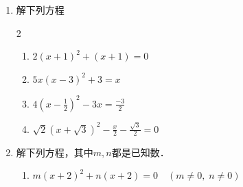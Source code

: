 \begin{enumerate}
        \begin{enumerate}
    \item $\sqrt{2}\left(x^{2}-x\right)=\frac{1}{\sqrt{2}}\left(x^{2}+x\right)$
        \end{enumerate}
    \item 解下列方程
    \begin{multicols}{2}
        \begin{enumerate}
    \item $2(x+1)^{2}+(x+1)=0$ 
    \item  $5 x(x-3)^{2}+3=x$
    \item  $4\left(x-\frac{1}{2}\right)^{2}-3 x=\frac{-3}{2}$
    \item  $\sqrt{2}(x+\sqrt{3})^{2}-\frac{x}{2}-\frac{\sqrt{3}}{2}=0$
        \end{enumerate}
    \end{multicols}
    \item 解下列方程，其中$m,n$都是已知数．
        \begin{enumerate}
\item  $m(x+2)^2+n(x+2)=0\quad  (m\ne 0,\; n\ne 0)$
        \end{enumerate}


\end{enumerate}
